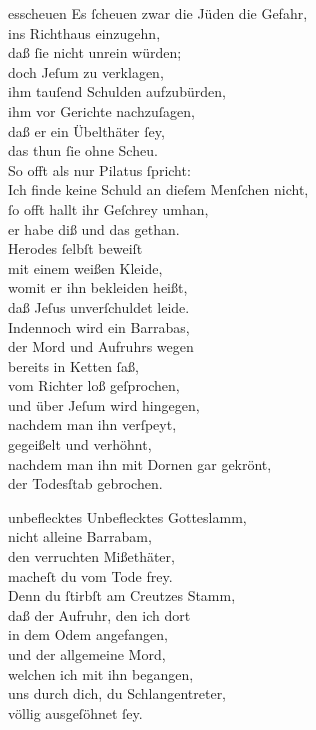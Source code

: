 \documentclass[abbrwidth=6em,tocstyle=ref-genre,shorttitlesize=50]{ees}
\begin{document}
{\begin{movement}{esscheuen}
  \voice[Tenore]
  Es ſcheuen zwar die Jüden die Gefahr,\\
  ins Richthaus einzugehn,\\
  daß ſie nicht unrein würden;\\
  doch Jeſum zu verklagen,\\
  ihm tauſend Schulden aufzubürden,\\
  ihm vor Gerichte nachzuſagen,\\
  daß er ein Übelthäter ſey,\\
  das thun ſie ohne Scheu.\\
  So offt als nur Pilatus ſpricht:\\
  Ich finde keine Schuld an dieſem Menſchen nicht,\\
  ſo offt hallt ihr Geſchrey umhan,\\
  er habe diß und das gethan.\\
  Herodes ſelbſt beweiſt\\
  mit einem weißen Kleide,\\
  womit er ihn bekleiden heißt,\\
  daß Jeſus unverſchuldet leide.\\
  Indennoch wird ein Barrabas,\\
  der Mord und Aufruhrs wegen\\
  bereits in Ketten ſaß,\\
  vom Richter loß geſprochen,\\
  und über Jeſum wird hingegen,\\
  nachdem man ihn verſpeyt,\\
  gegeißelt und verhöhnt,\\
  nachdem man ihn mit Dornen gar gekrönt,\\
  der Todesſtab gebrochen.
\end{movement}

\begin{movement}{unbeflecktes}
  \voice[Tenore]
  Unbeflecktes Gotteslamm,\\
  nicht alleine Barrabam,\\
  den verruchten Mißethäter,\\
  macheſt du vom Tode frey.\\
  Denn du ſtirbſt am Creutzes Stamm,\\
  daß der Aufruhr, den ich dort\\
  in dem Odem angefangen,\\
  und der allgemeine Mord,\\
  welchen ich mit ihn begangen,\\
  uns durch dich, du Schlangentreter,\\
  völlig ausgeſöhnet ſey.
\end{movement}

}
\end{document}
